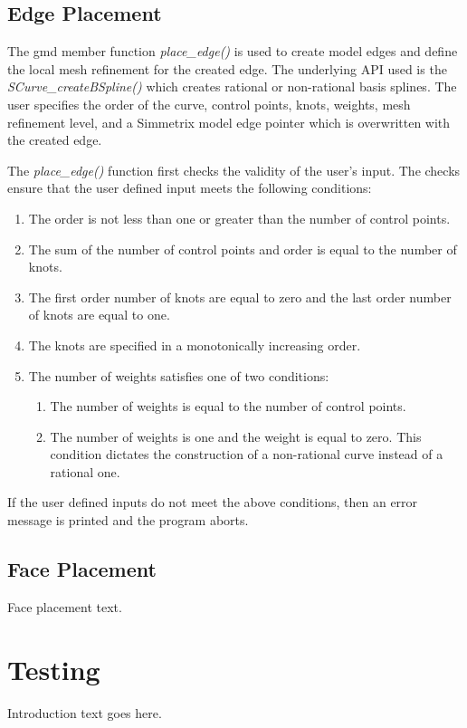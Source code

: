 \documentclass[a4paper, 12pt]{article}
\begin{document}
\subsection{Edge Placement} \label{subsec:edge}
The gmd member function \emph{place\_edge()} is used to create model edges and 
define the local mesh refinement for the created edge. The underlying API used
is the \emph{SCurve\_createBSpline()} which creates rational or non-rational
basis splines. The user specifies the order of the curve, control points, knots,
weights, mesh refinement level, and a Simmetrix model edge pointer which is 
overwritten with the created edge. 

The \emph{place\_edge()} function first checks the validity of the user's input.
The checks ensure that the user defined input meets the following conditions:
\begin{enumerate}
  \item The order is not less than one or greater than the number of control points.
  \item The sum of the number of control points and order is equal to 
      the number of knots.
  \item The first order number of knots are equal to zero and the last order number 
      of knots are equal to one.
  \item The knots are specified in a monotonically increasing order. 
  \item The number of weights satisfies one of two conditions:
    \begin{enumerate}
      \item The number of weights is equal to the number of control points.
      \item The number of weights is one and the weight is equal to zero. 
          This condition dictates the construction of a non-rational curve
          instead of a rational one.
    \end{enumerate}
\end{enumerate}

If the user defined inputs do not meet the above conditions, then an error 
message is printed and the program aborts.

\subsection{Face Placement} \label{subsec:face}
Face placement text.

\section{Testing} \label{sec:testing}
Introduction text goes here.
\end{document}
